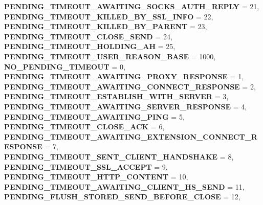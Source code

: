 \begin{DoxyCompactItemize}
{\bfseries P\+E\+N\+D\+I\+N\+G\+\_\+\+T\+I\+M\+E\+O\+U\+T\+\_\+\+A\+W\+A\+I\+T\+I\+N\+G\+\_\+\+S\+O\+C\+K\+S\+\_\+\+A\+U\+T\+H\+\_\+\+R\+E\+P\+LY} = 21, 
{\bfseries P\+E\+N\+D\+I\+N\+G\+\_\+\+T\+I\+M\+E\+O\+U\+T\+\_\+\+K\+I\+L\+L\+E\+D\+\_\+\+B\+Y\+\_\+\+S\+S\+L\+\_\+\+I\+N\+FO} = 22, 
{\bfseries P\+E\+N\+D\+I\+N\+G\+\_\+\+T\+I\+M\+E\+O\+U\+T\+\_\+\+K\+I\+L\+L\+E\+D\+\_\+\+B\+Y\+\_\+\+P\+A\+R\+E\+NT} = 23, 
\newline
{\bfseries P\+E\+N\+D\+I\+N\+G\+\_\+\+T\+I\+M\+E\+O\+U\+T\+\_\+\+C\+L\+O\+S\+E\+\_\+\+S\+E\+ND} = 24, 
{\bfseries P\+E\+N\+D\+I\+N\+G\+\_\+\+T\+I\+M\+E\+O\+U\+T\+\_\+\+H\+O\+L\+D\+I\+N\+G\+\_\+\+AH} = 25, 
{\bfseries P\+E\+N\+D\+I\+N\+G\+\_\+\+T\+I\+M\+E\+O\+U\+T\+\_\+\+U\+S\+E\+R\+\_\+\+R\+E\+A\+S\+O\+N\+\_\+\+B\+A\+SE} = 1000, 
{\bfseries N\+O\+\_\+\+P\+E\+N\+D\+I\+N\+G\+\_\+\+T\+I\+M\+E\+O\+UT} = 0, 
\newline
{\bfseries P\+E\+N\+D\+I\+N\+G\+\_\+\+T\+I\+M\+E\+O\+U\+T\+\_\+\+A\+W\+A\+I\+T\+I\+N\+G\+\_\+\+P\+R\+O\+X\+Y\+\_\+\+R\+E\+S\+P\+O\+N\+SE} = 1, 
{\bfseries P\+E\+N\+D\+I\+N\+G\+\_\+\+T\+I\+M\+E\+O\+U\+T\+\_\+\+A\+W\+A\+I\+T\+I\+N\+G\+\_\+\+C\+O\+N\+N\+E\+C\+T\+\_\+\+R\+E\+S\+P\+O\+N\+SE} = 2, 
{\bfseries P\+E\+N\+D\+I\+N\+G\+\_\+\+T\+I\+M\+E\+O\+U\+T\+\_\+\+E\+S\+T\+A\+B\+L\+I\+S\+H\+\_\+\+W\+I\+T\+H\+\_\+\+S\+E\+R\+V\+ER} = 3, 
{\bfseries P\+E\+N\+D\+I\+N\+G\+\_\+\+T\+I\+M\+E\+O\+U\+T\+\_\+\+A\+W\+A\+I\+T\+I\+N\+G\+\_\+\+S\+E\+R\+V\+E\+R\+\_\+\+R\+E\+S\+P\+O\+N\+SE} = 4, 
\newline
{\bfseries P\+E\+N\+D\+I\+N\+G\+\_\+\+T\+I\+M\+E\+O\+U\+T\+\_\+\+A\+W\+A\+I\+T\+I\+N\+G\+\_\+\+P\+I\+NG} = 5, 
{\bfseries P\+E\+N\+D\+I\+N\+G\+\_\+\+T\+I\+M\+E\+O\+U\+T\+\_\+\+C\+L\+O\+S\+E\+\_\+\+A\+CK} = 6, 
{\bfseries P\+E\+N\+D\+I\+N\+G\+\_\+\+T\+I\+M\+E\+O\+U\+T\+\_\+\+A\+W\+A\+I\+T\+I\+N\+G\+\_\+\+E\+X\+T\+E\+N\+S\+I\+O\+N\+\_\+\+C\+O\+N\+N\+E\+C\+T\+\_\+\+R\+E\+S\+P\+O\+N\+SE} = 7, 
{\bfseries P\+E\+N\+D\+I\+N\+G\+\_\+\+T\+I\+M\+E\+O\+U\+T\+\_\+\+S\+E\+N\+T\+\_\+\+C\+L\+I\+E\+N\+T\+\_\+\+H\+A\+N\+D\+S\+H\+A\+KE} = 8, 
\newline
{\bfseries P\+E\+N\+D\+I\+N\+G\+\_\+\+T\+I\+M\+E\+O\+U\+T\+\_\+\+S\+S\+L\+\_\+\+A\+C\+C\+E\+PT} = 9, 
{\bfseries P\+E\+N\+D\+I\+N\+G\+\_\+\+T\+I\+M\+E\+O\+U\+T\+\_\+\+H\+T\+T\+P\+\_\+\+C\+O\+N\+T\+E\+NT} = 10, 
{\bfseries P\+E\+N\+D\+I\+N\+G\+\_\+\+T\+I\+M\+E\+O\+U\+T\+\_\+\+A\+W\+A\+I\+T\+I\+N\+G\+\_\+\+C\+L\+I\+E\+N\+T\+\_\+\+H\+S\+\_\+\+S\+E\+ND} = 11, 
{\bfseries P\+E\+N\+D\+I\+N\+G\+\_\+\+F\+L\+U\+S\+H\+\_\+\+S\+T\+O\+R\+E\+D\+\_\+\+S\+E\+N\+D\+\_\+\+B\+E\+F\+O\+R\+E\+\_\+\+C\+L\+O\+SE} = 12, 

\end{DoxyCompactItemize}
